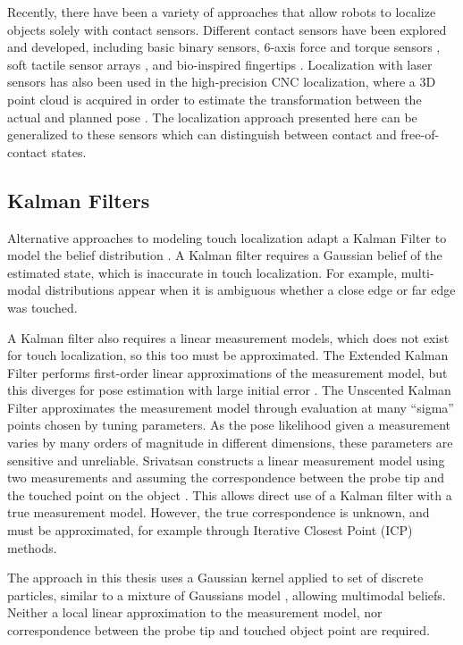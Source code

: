 \documentclass[../thesis.tex]{subfiles}
\begin{document}
Recently, there have been a variety of approaches that allow robots to localize objects solely with contact sensors. Different contact sensors have been explored and developed, including basic binary sensors, 6-axis force and torque sensors \cite{del2012control}, soft tactile sensor arrays \cite{hammond2012soft}, and bio-inspired fingertips \cite{fishel2012sensing}. Localization with laser sensors has also been used in the high-precision CNC localization, where a 3D point cloud is acquired in order to estimate the transformation between the actual and planned pose \cite{rajaraman2013automated}.
The localization approach presented here can be generalized to these sensors which can distinguish between contact and free-of-contact states.



\subsection{Kalman Filters}
Alternative approaches to modeling touch localization adapt a Kalman Filter to model the belief distribution \cite{Choukroun2006}\cite{Srivatsan}.
A Kalman filter requires a Gaussian belief of the estimated state, which is inaccurate in touch localization. 
For example, multi-modal distributions appear when it is ambiguous whether a close edge or far edge was touched. %

A Kalman filter also requires a linear measurement models, which does not exist for touch localization, so this too must be approximated.
The Extended Kalman Filter performs first-order linear approximations of the measurement model, but this diverges for pose estimation with large initial error \cite{Choukroun2006}.
The Unscented Kalman Filter approximates the measurement model through evaluation at many ``sigma'' points chosen by tuning parameters.
As the pose likelihood given a measurement varies by many orders of magnitude in different dimensions, these parameters are sensitive and unreliable.
Srivatsan constructs a linear measurement model using two measurements and assuming the correspondence between the probe tip and the touched point on the object \cite{Srivatsan}.
This allows direct use of a Kalman filter with a true measurement model.
However, the true correspondence is unknown, and must be approximated, for example through Iterative Closest Point (ICP) methods.

The approach in this thesis uses a Gaussian kernel applied to set of discrete particles, similar to a mixture of Gaussians model \cite{Thrun2000}, allowing multimodal beliefs.
Neither a local linear approximation to the measurement model, nor correspondence between the probe tip and touched object point are required.
\end{document}
